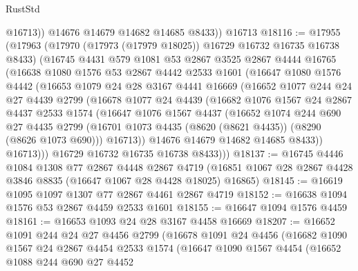 \begin{lexlean}{RustStd}
\begin{coremodule}
            @16713))
        @14676
        @14679
        @14682
        @14685
        @8433))
    @16713
@18116 := @17955
    (@17963
      (@17970 (@17973 (@17979 @18025)) @16729 @16732 @16735 @16738 @8433)
      (@16745
        @4431
        @579
        @1081
        @53
        @2867
        @3525
        @2867
        @4444
        @16765
        (@16638
          @1080
          @1576
          @53
          @2867
          @4442
          @2533
          @1601
          (@16647
            @1080
            @1576
            @4442
            (@16653
              @1079
              @24
              @28
              @3167
              @4441
              @16669
              (@16652
                @1077
                @244
                @24
                @27
                @4439
                @2799
                (@16678
                  @1077
                  @24
                  @4439
                  (@16682
                    @1076
                    @1567
                    @24
                    @2867
                    @4437
                    @2533
                    @1574
                    (@16647
                      @1076
                      @1567
                      @4437
                      (@16652
                        @1074
                        @244
                        @690
                        @27
                        @4435
                        @2799
                        (@16701 @1073 @4435 (@8620 (@8621 @4435)) (@8290 (@8626 @1073 @690)))
                        @16713))
                    @14676
                    @14679
                    @14682
                    @14685
                    @8433))
                @16713)))
          @16729
          @16732
          @16735
          @16738
          @8433)))
@18137 := @16745
    @4446
    @1084
    @1308
    @77
    @2867
    @4448
    @2867
    @4719
    (@16851 @1067 @28 @2867 @4428 @3846 @8835 (@16647 @1067 @28 @4428 @18025) @16865)
@18145 := @16619 @1095 @1097 @1307 @77 @2867 @4461 @2867 @4719
@18152 := @16638 @1094 @1576 @53 @2867 @4459 @2533 @1601
@18155 := @16647 @1094 @1576 @4459
@18161 := @16653 @1093 @24 @28 @3167 @4458 @16669
@18207 := @16652
    @1091
    @244
    @24
    @27
    @4456
    @2799
    (@16678
      @1091
      @24
      @4456
      (@16682
        @1090
        @1567
        @24
        @2867
        @4454
        @2533
        @1574
        (@16647
          @1090
          @1567
          @4454
          (@16652
            @1088
            @244
            @690
            @27
            @4452

\end{coremodule}
\end{lexlean}
